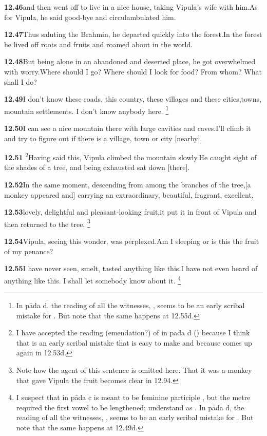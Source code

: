 \textbf{12.46}and then went off to live in a nice house, taking Vipula's wife with him.As for Vipula, he said good-bye and circulambulated him.%


\textbf{12.47}Thus saluting the Brahmin, he departed quickly into the forest.In the forest he lived off roots and fruits and roamed about in the world.%


\textbf{12.48}But being alone in an abandoned and deserted place, he got overwhelmed with worry.Where should I go? Where should I look for food? From whom? What shall I do?%


\textbf{12.49}I don't know these roads, this country, these villages and these cities,towns, mountain settlements. I don't know anybody here.%
\footnote{In pāda d, the reading of all the witnesses, , seems to be               an early scribal mistake for . But note that the same happens at                 12.55d.  }%


\textbf{12.50}I can see a nice mountain there with large cavities and caves.I'll climb it and try to figure out if there is a village, town or city [nearby].%


\textbf{12.51}%
\footnote{I have accepted the reading (emendation?) of \Ed in pāda d ()               because I think that  is an early scribal mistake that               is easy to make and because  comes up again in 12.53d.  }Having said this, Vipula climbed the mountain slowly.He caught sight of the shades of a tree, and being exhausted sat down [there].%


\textbf{12.52}In the same moment, descending from among the branches of the tree,[a monkey appeared and] carrying an extraordinary, beautiful, fragrant, excellent,%


\textbf{12.53}lovely, delightful and pleasant-looking fruit,it put it in front of Vipula and then returned to the tree.%
\footnote{Note how the agent of this sentence is omitted here. That it was a monkey               that gave Vipula the fruit becomes clear in 12.94.  }%


\textbf{12.54}Vipula, seeing this wonder, was perplexed.Am I sleeping or is this the fruit of my penance?%


\textbf{12.55}I have never seen, smelt, tasted anything like this.I have not even heard of anything like this. I shall let somebody know about it.%
\footnote{I suspect that  in pāda c is meant to be feminine participle , but               the metre required the first vowel to be lengthened; understand  as .               In pāda d, the reading of all the witnesses, , seems to be               an early scribal mistake for . But note that the same happens at                 12.49d.  }%


